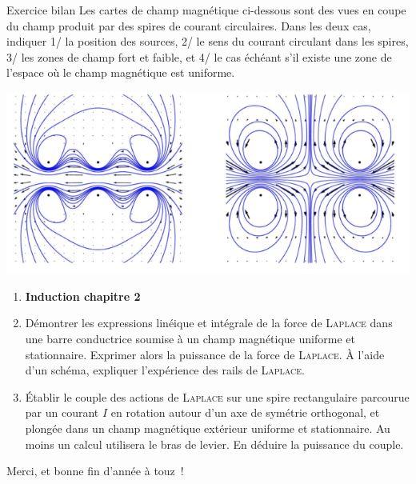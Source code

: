 \documentclass[a4paper, 11pt, final, garamond]{book}
\begin{document}
\noindent
\begin{texem}{Exercice bilan}
  Les cartes de champ magnétique ci-dessous sont des vues en coupe du champ
  produit par des spires de courant circulaires. Dans les deux cas, indiquer 1/ la
  position des sources, 2/ le sens du courant circulant dans les spires, 3/ les
  zones de champ fort et faible, et 4/ le cas échéant s'il existe une zone de
  l'espace où le champ magnétique est uniforme.
  \begin{center}
    \includegraphics[scale=.8]{../figures/ch30/ldc_bilan}
  \end{center}
\end{texem}
\begin{enumerate}[resume, label=\sqenumi]
  \item[] \textbf{Induction chapitre 2}
  \item Démontrer les expressions linéique et intégrale de la force de
    \textsc{Laplace} dans une barre conductrice soumise à un champ magnétique
    uniforme et stationnaire. Exprimer alors la puissance de la force de
    \textsc{Laplace}. À l'aide d'un schéma, expliquer l'expérience des rails de
    \textsc{Laplace}.
  \item Établir le couple des actions de \textsc{Laplace} sur une spire
    rectangulaire parcourue par un courant $I$ en rotation autour d'un axe de
    symétrie orthogonal, et plongée dans un champ magnétique extérieur uniforme et
    stationnaire. Au moins un calcul utilisera le bras de levier. En déduire la
    puissance du couple.
\end{enumerate}

\vfill

\begin{center}
  \begin{framed}
    \Large
    Merci, et bonne fin d'année à touz~!
  \end{framed}
\end{center}

\vfill
\end{document}
